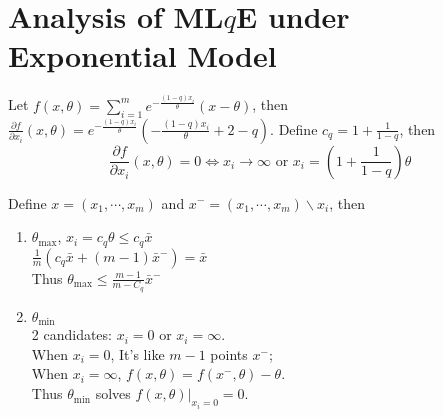 \documentclass[a4paper]{article}
\begin{document}
\newpage

\section{Analysis of ML$q$E under Exponential Model}

Let $f(x, \theta) = \sum_{i=1}^m e^{-\frac{(1-q) x_i}{\theta}} (x - \theta)$, then $\frac{\partial f}{\partial x_i}(x, \theta) = e^{-\frac{(1-q) x_i}{\theta}} \left( - \frac{(1-q) x_i}{\theta} + 2 - q \right)$.
Define $c_q = 1 + \frac{1}{1-q}$, then
\[
	\frac{\partial f}{\partial x_i}(x, \theta) = 0 \Leftrightarrow
    x_i \to \infty \text{ or } x_i = (1 + \frac{1}{1-q}) \theta
\]

Define $x = (x_1, \cdots, x_m)$ and $x^- = (x_1, \cdots, x_m) \backslash x_i$, then
\begin{enumerate}
\item $\theta_{\mathrm{max}}$,
$x_i = c_q \theta \le c_q \bar{x}$ \\
$\frac{1}{m} \left( c_q \bar{x} + (m-1) \bar{x}^- \right) = \bar{x}$ \\
Thus $\theta_{\mathrm{max}} \le \frac{m-1}{m-C_q} \bar{x}^-$
\item $\theta_{\mathrm{min}}$ \\
2 candidates: $x_i = 0$ or $x_i = \infty$.\\
When $x_i = 0$, It's like $m-1$ points $x^-$; \\
When $x_i = \infty$, $f(x,\theta) = f(x^-, \theta) - \theta$. \\
Thus $\theta_{\mathrm{min}}$ solves $f(x,\theta)|_{x_i = 0} = 0$.
\end{enumerate}


{}

\end{document}
